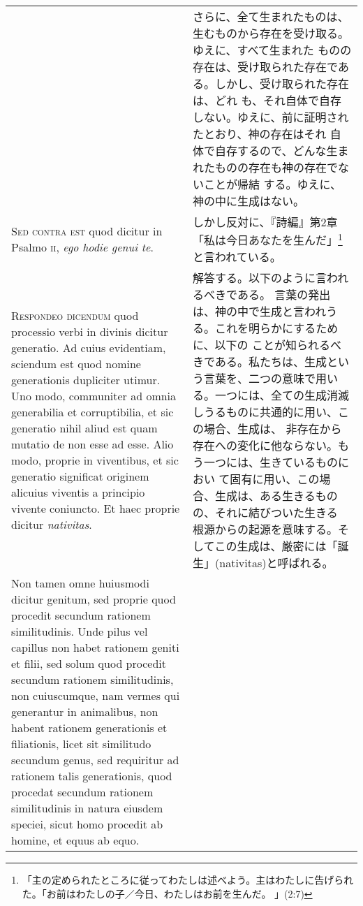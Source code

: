 \documentclass[10pt]{jsarticle} %
\begin{document}
\begin{longtable}{p{21em}p{21em}}
&


さらに、全て生まれたものは、生むものから存在を受け取る。ゆえに、すべて生まれた
 ものの存在は、受け取られた存在である。しかし、受け取られた存在は、どれ
 も、それ自体で自存しない。ゆえに、前に証明されたとおり、神の存在はそれ
 自体で自存するので、どんな生まれたものの存在も神の存在でないことが帰結
 する。ゆえに、神の中に生成はない。

\\



{\scshape Sed contra est} quod dicitur in Psalmo {\scshape ii}, {\itshape ego hodie genui te}.


&

しかし反対に、『詩編』第2章「私は今日あなたを生んだ」\footnote{「主の定められたところに従ってわたしは述べよう。主はわたしに告げられた。「お前はわたしの子／今日、わたしはお前を生んだ。 」(2:7)}と言われている。

\\



{\scshape Respondeo dicendum} quod processio verbi in divinis dicitur generatio. Ad
cuius evidentiam, sciendum est quod nomine generationis dupliciter
utimur. Uno modo, communiter ad omnia generabilia et corruptibilia, et
sic generatio nihil aliud est quam mutatio de non esse ad esse. Alio
modo, proprie in viventibus, et sic generatio significat originem
alicuius viventis a principio vivente coniuncto. Et haec proprie dicitur
{\itshape nativitas}. 


&

解答する。以下のように言われるべきである。
言葉の発出は、神の中で生成と言われうる。これを明らかにするために、以下の
 ことが知られるべきである。私たちは、生成という言葉を、二つの意味で用い
 る。一つには、全ての生成消滅しうるものに共通的に用い、この場合、生成は、
 非存在から存在への変化に他ならない。もう一つには、生きているものにおい
 て固有に用い、この場合、生成は、ある生きるものの、それに結びついた生きる
 根源からの起源を意味する。そしてこの生成は、厳密には「誕生」(nativitas)と呼ばれる。



\\


Non tamen omne huiusmodi dicitur genitum, sed proprie quod
procedit secundum rationem similitudinis. Unde pilus vel capillus non
habet rationem geniti et filii, sed solum quod procedit secundum
rationem similitudinis, non cuiuscumque, nam vermes qui generantur in
animalibus, non habent rationem generationis et filiationis, licet sit
similitudo secundum genus, sed requiritur ad rationem talis
generationis, quod procedat secundum rationem similitudinis in natura
eiusdem speciei, sicut homo procedit ab homine, et equus ab equo. 




\end{longtable}
\end{document}
